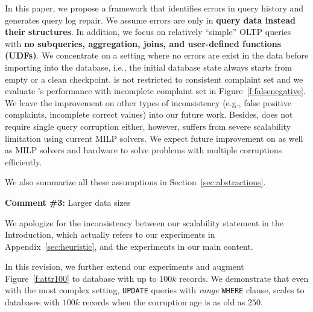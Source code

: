 In this paper, we propose a framework \sys that identifies errors in query history and generates query log repair. 
We assume errors are only in \textbf{query data instead their structures}. In addition, we focus on relatively 
``simple'' OLTP queries with \textbf{no subqueries, aggregation, joins, and user-defined functions (UDFs)}. 
We concentrate on a setting where no errors are exist in the data before importing into the database, i.e., 
the initial database state always starts from empty or a clean checkpoint. \sys is not restricted to consistent 
complaint set and we evaluate \sys's performance with incomplete complaint set in Figure~\ref{f:falsenegative}. 
We leave the improvement on other types of inconsistency (e.g., false positive complaints, incomplete correct
values) into our future work. Besides, \sys does not require single query corruption either, however, \sys 
suffers from severe scalability limitation using current MILP solvers. We expect future improvement on \sys
as well as MILP solvers and hardware to solve problems with multiple corruptions efficiently. 

We also summarize all these assumptions in Section~\ref{sec:abstractions}.


\comskip

\noindent
\textbf{Comment \#3:} Larger data sizes
\begin{quote}
\end{quote}

We apologize for the inconsistency between our scalability statement in the Introduction, 
which actually refers to our experiments in Appendix~\ref{sec:heuristic}, and the experiments 
in our main content. 

In this revision, we further extend our experiments and augment
Figure~\ref{f:attr100} to database with up to $100k$ records. 
We demonstrate that even with the most complex
setting, \texttt{UPDATE} queries with \textit{range} \texttt{WHERE} clause,
\sys scales to databases with $100k$ records when the corruption age is as old
as $250$.



